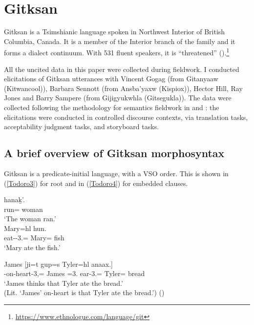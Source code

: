 \documentclass[output=paper]{langscibook}
\begin{document}
\section{Gitksan}\label{Todoro:sect2}

Gitksan is a Tsimshianic language spoken in Northwest Interior of British Columbia, Canada. It is a member of the Interior branch of the family and it forms a dialect continuum. With 531 fluent speakers, it is ``threatened'' (\citealt{dunlop2018a}).\footnote{\url{https://www.ethnologue.com/language/git}}

All the uncited data in this paper were collected during fieldwork. I conducted elicitations of Gitksan utterances with Vincent Gogag (from Gitanyaaw (Kitwancool)), Barbara Sennott (from Ansba’yaxw (Kispiox)), Hector Hill, Ray Jones and Barry Sampere (from Gijigyukwhla (Gitsegukla)). The data were collected following the methodology for semantics fieldwork in \citet{matthewson2004a} and \citet{burton2015a}: the elicitations were conducted in controlled discourse contexts, via translation tasks, acceptability judgment tasks, and storyboard tasks.

\subsection{A brief overview of Gitksan morphosyntax}

Gitksan is a predicate-initial language, with a VSO order. This is shown in (\ref{Todoro3}) for root and in (\ref{Todoro4}) for embedded clauses.

\begin{exe}
\ex \label{Todoro3}
\begin{xlist}

\ex \label{Todoro3a} 
 {hanak̲'.}\\
    run={\cn} woman\\
\glt `The woman ran.’ \citep[159]{davis2015a}\\

\ex \label{Todoro3b}
 {Mary=hl} {hun.}\\
    eat-{\tr}-3.{\seriesIII}={\dn} Mary={\cn} fish\\
\glt `Mary ate the fish.’ \citep[8]{forbes2019a} \\

\end{xlist}

\ex \label{Todoro4}
 {James} [{ji=t} {gup=s} {Tyler=hl} {anaax.}] \\
{}-on-heart-3,{\seriesIII}={\dn} James {\irr}=3.{\seriesI} ear-3.{\seriesII}={\dn} Tyler={\cn} bread \\
\glt `James thinks that Tyler ate the bread.' \\ (Lit. `James' on-heart is that Tyler ate the bread.') (\citealt[57]{davis2011a})
\end{exe}
\end{document}
